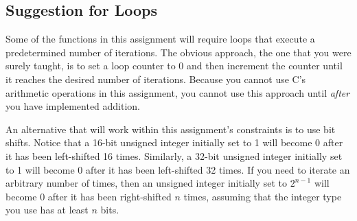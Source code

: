 \subsection{Suggestion for Loops}

Some of the functions in this assignment will require loops that execute a predetermined number of iterations.
The obvious approach, the one that you were surely taught, is to set a loop counter to 0 and then increment the counter until it reaches the desired number of iterations.
Because you cannot use C's arithmetic operations in this assignment, you cannot use this approach until \textit{after} you have implemented addition.

An alternative that will work within this assignment's constraints is to use bit shifts.
Notice that a 16-bit unsigned integer initially set to 1 will become 0 after it has been left-shifted 16 times.
Similarly, a 32-bit unsigned integer initially set to 1 will become 0 after it has been left-shifted 32 times.
If you need to iterate an arbitrary number of times, then an unsigned integer initially set to $2^{n-1}$ will become 0 after it has been right-shifted $n$ times, assuming that the integer type you use has at least $n$ bits.
